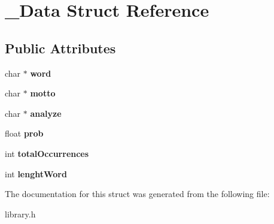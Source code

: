 \hypertarget{struct__Data}{}\section{\+\_\+\+Data Struct Reference}
\label{struct__Data}
\subsection*{Public Attributes}
\begin{DoxyCompactItemize}
\item 
\mbox{\label{struct__Data_a9a1f93b633bb116da8a09169c2475651}} 
char $\ast$ {\bfseries word}
\item 
\mbox{\label{struct__Data_ad03e2970d95fbd4128d0fda12cd94844}} 
char $\ast$ {\bfseries motto}
\item 
\mbox{\label{struct__Data_a70d8e1db27f9c6bc12102527fd585e0a}} 
char $\ast$ {\bfseries analyze}
\item 
\mbox{\label{struct__Data_a0eb20cfcb1816e9eb4b41e45b981dcd9}} 
float {\bfseries prob}
\item 
\mbox{\label{struct__Data_aad34f3ac5590099c8bce026e115c8e53}} 
int {\bfseries total\+Occurrences}
\item 
\mbox{\label{struct__Data_a94bd7619e92c5ce3369c2b94a9e3048f}} 
int {\bfseries lenght\+Word}
\end{DoxyCompactItemize}


The documentation for this struct was generated from the following file\+:\begin{DoxyCompactItemize}
\item 
library.\+h\end{DoxyCompactItemize}
